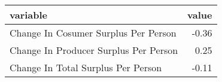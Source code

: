 \begin{tabular}{lr}
  \hline
variable & value \\ 
  \hline
Change In Cosumer Surplus Per Person & -0.36 \\ 
  Change In Producer Surplus Per Person & 0.25 \\ 
  Change In Total Surplus Per Person & -0.11 \\ 
   \hline
\end{tabular}
